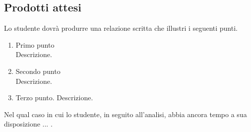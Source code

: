 \subsection{Prodotti attesi}
Lo studente dovrà produrre una relazione scritta che illustri i seguenti punti.
\begin{enumerate}
    \item Primo punto \\
    Descrizione. 
    
    \item Secondo punto \\
    Descrizione.
    
    \item Terzo punto.
    Descrizione.
\end{enumerate}

Nel qual caso in cui lo studente, in seguito all'analisi, abbia ancora tempo a sua disposizione ... .

